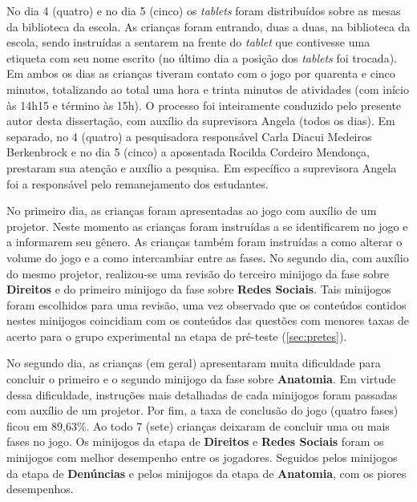 No dia 4 (quatro) e no dia 5 (cinco) os \textit{tablets} foram distribuídos sobre as mesas da biblioteca da escola. As crianças foram entrando, duas a duas, na biblioteca da escola, sendo instruídas a sentarem na frente do \textit{tablet} que contivesse uma etiqueta com seu nome escrito (no último dia a posição dos \textit{tablets} foi trocada). Em ambos os dias as crianças tiveram contato com o jogo por quarenta e cinco minutos, totalizando ao total uma hora e trinta minutos de atividades (com início às 14h15 e término às 15h). O processo foi inteiramente conduzido pelo presente autor desta dissertação, com auxílio da suprevisora Angela (todos os dias). Em separado, no 4 (quatro) a pesquisadora responsável Carla Diacui Medeiros Berkenbrock e no dia 5 (cinco) a aposentada Rocilda Cordeiro Mendonça, prestaram sua atenção e auxílio a pesquisa. Em específico a suprevisora Angela foi a responsável pelo remanejamento dos estudantes. %

No primeiro dia, as crianças foram apresentadas ao jogo com auxílio de um projetor. Neste momento as crianças foram instruídas a se identificarem no jogo e a informarem seu gênero. As crianças também foram instruídas a como alterar o volume do jogo e a como intercambiar entre as fases. No segundo dia, com auxílio do mesmo projetor, realizou-se uma revisão do terceiro minijogo da fase sobre \textbf{Direitos} e do primeiro minijogo da fase sobre \textbf{Redes Sociais}. Tais minijogos foram escolhidos para uma revisão, uma vez observado que os conteúdos contidos nestes minijogos coincidiam com os conteúdos das questões com menores taxas de acerto para o grupo experimental na etapa de pré-teste (\autoref{sec:pretes}).

No segundo dia, as crianças (em geral) apresentaram muita dificuldade para concluir o primeiro e o segundo minijogo da fase sobre \textbf{Anatomia}. Em virtude dessa dificuldade, instruções mais detalhadas de cada minijogos foram passadas com auxílio de um projetor. Por fim, a taxa de conclusão do jogo (quatro fases) ficou em 89,63\%. Ao todo 7 (sete) crianças deixaram de concluir uma ou mais fases no jogo. Os minijogos da etapa de \textbf{Direitos} e \textbf{Redes Sociais} foram os minijogos com melhor desempenho entre os jogadores. Seguidos pelos minijogos da etapa de \textbf{Denúncias} e pelos minijogos da etapa de \textbf{Anatomia}, com os piores desempenhos. 

